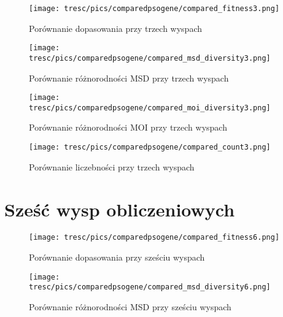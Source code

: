 \begin{figure}[H]
\begin{center} 
\texttt{[image: tresc/pics/comparedpsogene/compared\_fitness3.png]}
\caption{Porównanie dopasowania przy trzech wyspach}
\label{fig:compared_fintess3}
\end{center}
\end{figure}

\begin{figure}[H]
\begin{center} 
\texttt{[image: tresc/pics/comparedpsogene/compared\_msd\_diversity3.png]}
\caption{Porównanie różnorodności MSD przy trzech wyspach}
\label{fig:compared_msd_diversity3}
\end{center}
\end{figure}

\begin{figure}[H]
\begin{center} 
\texttt{[image: tresc/pics/comparedpsogene/compared\_moi\_diversity3.png]}
\caption{Porównanie różnorodności MOI przy trzech wyspach}
\label{fig:compared_moi_diversity3}
\end{center}
\end{figure}

\begin{figure}[H]
\begin{center} 
\texttt{[image: tresc/pics/comparedpsogene/compared\_count3.png]}
\caption{Porównanie liczebności przy trzech wyspach}
\label{fig:compared_count3}
\end{center}
\end{figure}


\section{Sześć wysp obliczeniowych}

\begin{figure}[H]
\begin{center} 
\texttt{[image: tresc/pics/comparedpsogene/compared\_fitness6.png]}
\caption{Porównanie dopasowania przy sześciu wyspach}
\label{fig:compared_fintess6}
\end{center}
\end{figure}

\begin{figure}[H]
\begin{center} 
\texttt{[image: tresc/pics/comparedpsogene/compared\_msd\_diversity6.png]}
\caption{Porównanie różnorodności MSD przy sześciu wyspach}
\label{fig:compared_msd_diversity6}
\end{center}
\end{figure}

